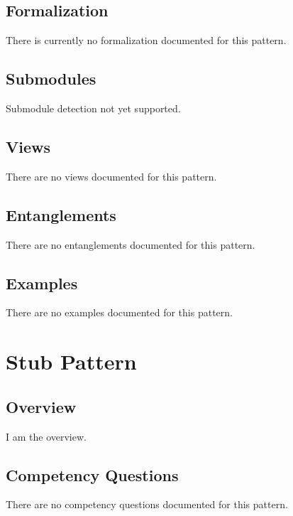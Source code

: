 \subsection{Formalization}
\label{ssec:formalization}
There is currently no formalization documented for this pattern.

\subsection{Submodules}
\label{ssec:submodules}
Submodule detection not yet supported.

\subsection{Views}
\label{ssec:views}
There are no views documented for this pattern.


\subsection{Entanglements}
\label{ssec:entanglements}
There are no entanglements documented for this pattern.

\subsection{Examples}
\label{ssec:examples}
There are no examples documented for this pattern.


\section{Stub Pattern}
\label{sec:stub-pattern}
\subsection{Overview}
\label{ssec:overview}
I am the overview.

\subsection{Competency Questions}
\label{ssec:cqs}
There are no competency questions documented for this pattern.

